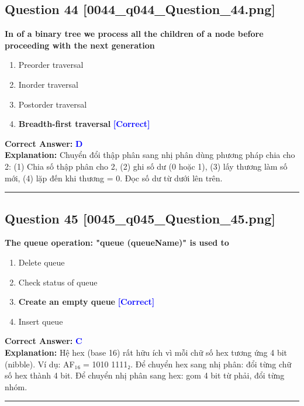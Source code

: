 \documentclass[11pt,a4paper]{article}
\begin{document}
\begin{minipage}{\textwidth}
\subsection*{Question 44 \quad \footnotesize{[0044\_q044\_Question\_44.png]}}
\noindent \textbf{In of a binary tree we process all the children of a node before proceeding with the next generation}

\begin{enumerate}[label=\Alph*.]
    \item Preorder traversal
    \item Inorder traversal
    \item Postorder traversal
    \item \textbf{Breadth-first traversal} \hfill \textcolor{blue}{\textbf{[Correct]}}
\end{enumerate}

\noindent \textbf{Correct Answer:} \textcolor{blue}{\textbf{D}} \\[2pt]
\noindent \textbf{Explanation:} Chuyển đổi thập phân sang nhị phân dùng phương pháp chia cho 2: (1) Chia số thập phân cho 2, (2) ghi số dư (0 hoặc 1), (3) lấy thương làm số mới, (4) lặp đến khi thương = 0. Đọc số dư từ dưới lên trên.

\par\vspace{0.3cm}
\hrule
\vspace{0.3cm}
\end{minipage}

\begin{minipage}{\textwidth}
\subsection*{Question 45 \quad \footnotesize{[0045\_q045\_Question\_45.png]}}
\noindent \textbf{The queue operation: "queue (queueName)" is used to}

\begin{enumerate}[label=\Alph*.]
    \item Delete queue
    \item Check status of queue
    \item \textbf{Create an empty queue} \hfill \textcolor{blue}{\textbf{[Correct]}}
    \item Insert queue
\end{enumerate}

\noindent \textbf{Correct Answer:} \textcolor{blue}{\textbf{C}} \\[2pt]
\noindent \textbf{Explanation:} Hệ hex (base 16) rất hữu ích vì mỗi chữ số hex tương ứng 4 bit (nibble). Ví dụ: AF₁₆ = 1010 1111₂. Để chuyển hex sang nhị phân: đổi từng chữ số hex thành 4 bit. Để chuyển nhị phân sang hex: gom 4 bit từ phải, đổi từng nhóm.

\par\vspace{0.3cm}
\hrule
\vspace{0.3cm}
\end{minipage}
\end{document}
